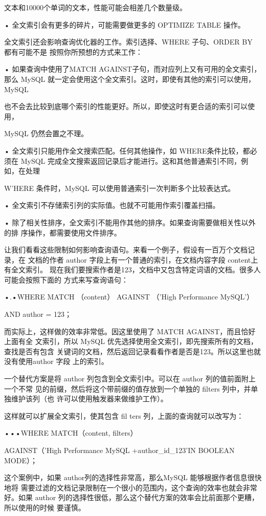 文本和10000个单词的文本，性能可能会相差几个数量级。

• 全文索引会有更多的碎片，可能需要做更多的 OPTIMIZE TABLE 操作。

全文索引还会影响查询优化器的工作。索引选择、WHERE 子句、ORDER BY 都有可能不是
按照你所预想的方式来工作：

• 如果查询中使用了MATCH AGAINST子句，而对应列上又有可用的全文索引，那么
MySQL 就一定会使用这个全文索引。这时，即使有其他的索引可以使用，MySQL

也不会去比较到底哪个索引的性能更好。所以，即使这时有更合适的索引可以使用，

MySQL 仍然会置之不理。

• 全文索引只能用作全文搜索匹配。任何其他操作，如 WHERE条件比较，都必须在
MySQL 完成全文搜索返回记录后才能进行。这和其他普通索引不同，例如，在处理

W'HERE 条件时，MySQL 可以使用普通索引一次判断多个比较表达式。

• 全文索引不存储索引列的实际值。也就不可能用作索引覆盖扫描。

• 除了相关性排序，全文索引不能用作其他的排序。如果查询需要做相关性以外的排
序操作，都需要使用文件排序。

让我们看看这些限制如何影响查询语句。来看一个例子，假设有一百万个文档记录，在
文档的作者 author 字段上有一个普通的索引，在文档内容字段 content上有全文索引。
现在我们要搜索作者是123，文档中又包含特定词语的文档。很多人可能会按照下面的
方式来写查询语句：

•.•WHERE MATCH （content） AGAINST （'High Performance MySQL'）

AND author = 123；

而实际上，这样做的效率非常低。因这里使用了 MATCH AGAINST，而且恰好上面有全
文索引，所以 MySQL 优先选择使用全文索引，即先搜索所有的文档，查找是否有包含
关键词的文档，然后返回记录看看作者是否是123。所以这里也就没有使用author 字段
上的索引。

一个替代方案是将 author 列包含到全文索引中。可以在 author 列的值前面附上一个不常
见的前缀，然后将这个带前缀的值存放到一个单独的 filters 列中，并单独维护该列（也
许可以使用触发器来做维护工作）。

这样就可以扩展全文索引，使其包含 fil ters 列，上面的查询就可以改写为：

•••WHERE MATCH（content, filters）

AGAINST（'High Performance MySQL +author\_id\_123'IN BOOLEAN MODE）；

这个案例中，如果 author列的选择性非常高，那么MySQL 能够根据作者信息很快地将
需要过滤的文档记录限制在一个很小的范围内，这个查询的效率也就会非常好。如果
author 列的选择性很低，那么这个替代方案的效率会比前面那个更糟，所以使用的时候
要谨慎。

